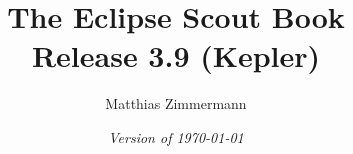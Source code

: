 
\author{Matthias Zimmermann}
\title{\Huge\textbf{The Eclipse Scout Book} \\
\Large Release 3.9 (Kepler)}
\ifpdf
  \isodate
\fi
\date{\emph{Version of \today}}
\maketitle

